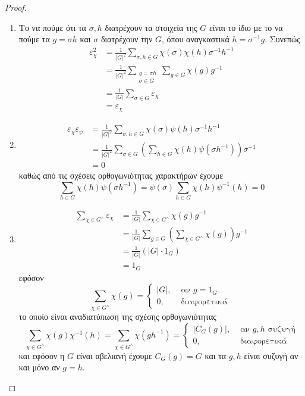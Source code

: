 \begin{proof}$ $

	\begin{enumerate}
		
		\item Το να πούμε ότι τα $\sigma, h$ διατρέχουν τα στοιχεία της $G$ είναι το ίδιο με το να πούμε τα $g=\sigma h$ και $\sigma$ διατρέχουν την $G$, όπου αναγκαστικά $h=\sigma^{-1}g$. Συνεπώς
	\begin{align*}
		\varepsilon^2_\chi &= \frac{1}{|G|^2} \sum\limits_{\sigma,h \in G} \chi(\sigma)\chi(h) \sigma^{-1}h^{-1} \\
		&= \frac{1}{|G|^2}\sum\limits_{\substack{g = \sigma h\\ \sigma \in G}} \sum\limits_{g \in G} \chi(g)g^{-1} \\
		&= \frac{1}{|G|} \sum\limits_{\sigma \in G} \varepsilon_{\chi} \\
		&= \varepsilon_{\chi}
	\end{align*}

		\item
		\begin{align*}
			\varepsilon_\chi \varepsilon_\psi &= \frac{1}{|G|^2} \sum\limits_{\sigma,h \in G} \chi(\sigma)\psi(h) \sigma^{-1}h^{-1} \\
		&= \frac{1}{|G|^2} \sum\limits_{\sigma \in G} \left(\sum\limits_{h \in G} \chi(h)\psi(\sigma h^{-1})\right) \sigma^{-1} \\
		&= 0
\end{align*}
\noindent καθώς από τις σχέσεις ορθογωνιότητας χαρακτήρων έχουμε
$$\sum\limits_{h \in G} \chi(h) \psi(\sigma h^{-1}) = \psi(\sigma) \sum\limits_{h \in G}\chi(h)\psi^{-1}(h) = 0$$


\item 
\begin{align*} \sum\limits_{\chi \in G^{\wedge}} \varepsilon_{\chi} &= \frac1{|G|} \sum\limits_{\chi \in G^{\wedge}} \chi(g) g^{-1} \\
	&= \frac1{|G|} \sum\limits_{g \in G}\left(\sum\limits_{\chi \in G^{\wedge}} \chi(g)\right) g^{-1} \\
	&= \frac{1}{|G|} \left(|G| \cdot 1_G\right)\\
	&= 1_G
 \end{align*}
 \noindent εφόσον
 $$\sum\limits_{\chi \in G^{\wedge}}\chi(g) = \begin{cases}
	|G|, & \text{ αν } g=1_G \\
	0, & \text{ διαφορετικά } \end{cases} $$
\noindent το οποίο είναι αναδιατύπωση της σχέσης ορθογωνιότητας 
$$\sum\limits_{\chi \in G^{\wedge}} \chi(g) \chi^{-1}(h) =  \sum\limits_{\chi \in G^{\wedge}} \chi(gh^{-1}) = \begin{cases}
	|C_G(g)|, & \text{ αν } g,h \text{ συζυγή} \\
	0, & \text{ διαφορετικά }\end{cases}$$ και εφόσον η $G$ είναι αβελιανή έχουμε $C_G(g) = G$ και τα $g,h$ είναι συζυγή αν και μόνο αν $g=h$.


\end{enumerate}
\end{proof}
